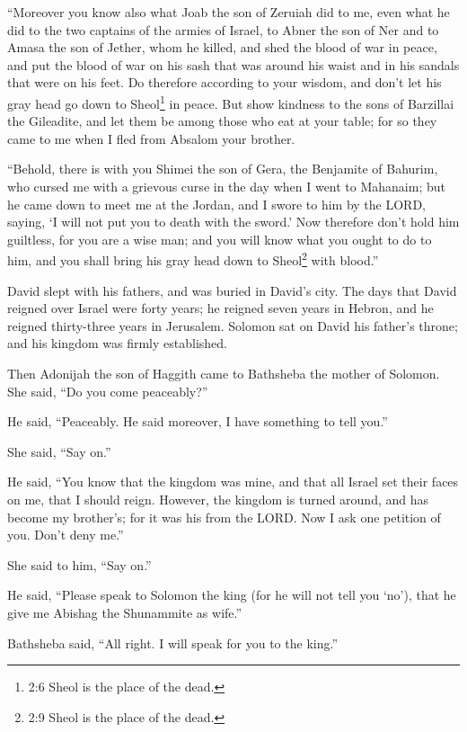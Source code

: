\myverse{}“Moreover you know also what Joab the son of Zeruiah did to me,
even what he did to the two captains of the armies of Israel, to Abner the son of Ner and to Amasa the
son of Jether, whom he killed, and shed the blood of war in peace, and put the blood of war on his sash
that was around his waist and in his sandals that were on his feet.
\myverse{}Do therefore according to your wisdom, and don’t let his gray head go down to
Sheol\footnote{2:6 Sheol is the place of the dead.} in peace.
\myverse{}But show kindness to the sons of Barzillai the Gileadite, and let them be among
those who eat at your table; for so they came to me when I fled from Absalom your brother.

\myverse{}“Behold, there is with you Shimei the son of Gera, the Benjamite
of Bahurim, who cursed me with a grievous curse in the day when I went to Mahanaim; but he came down to
meet me at the Jordan, and I swore to him by the LORD, saying, ‘I will not put you to death with the sword.’
\myverse{}Now therefore don’t hold him guiltless, for you are a wise man; and you will
know what you ought to do to him, and you shall bring his gray head down to Sheol\footnote{2:9 Sheol is the place of the dead.} with blood.”

\myverse{}David slept with his fathers, and was buried in David’s city.
\myverse{}The days that David reigned over Israel were forty years; he reigned seven
years in Hebron, and he reigned thirty-three years in Jerusalem.
\myverse{}Solomon sat on David his father’s throne; and his kingdom was firmly established.

\myverse{}Then Adonijah the son of Haggith came to Bathsheba the mother
of Solomon. She said, “Do you come peaceably?”

He said, “Peaceably.
\myverse{}He said moreover, I have something to tell you.”

She said, “Say on.”

\myverse{}He said, “You know that the kingdom was mine, and that all Israel
set their faces on me, that I should reign. However, the kingdom is turned around, and has become my brother’s;
for it was his from the LORD.
\myverse{}Now I ask one petition of you. Don’t deny me.”

She said to him, “Say on.”

\myverse{}He said, “Please speak to Solomon the king (for he will not tell
you ‘no’), that he give me Abishag the Shunammite as wife.”

\myverse{}Bathsheba said, “All right. I will speak for you to the king.”

